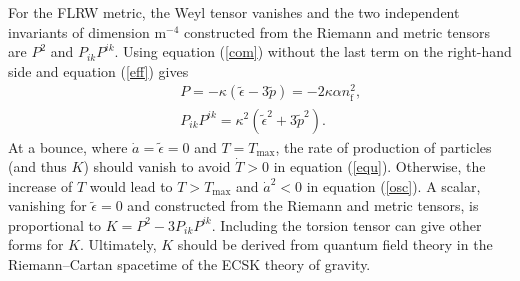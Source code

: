 \documentclass[prd,onecolumn,nofootinbib]{revtex4}
\begin{document}
For the FLRW metric, the Weyl tensor vanishes and the two independent invariants of dimension m$^{-4}$ constructed from the Riemann and metric tensors are $P^2$ and $P_{ik}P^{ik}$.
Using equation (\ref{com}) without the last term on the right-hand side and equation (\ref{eff}) gives
\begin{eqnarray}
& & P=-\kappa(\tilde{\epsilon}-3\tilde{p})=-2\kappa\alpha n_\textrm{f}^2, \nonumber \\
& & P_{ik}P^{ik}=\kappa^2(\tilde{\epsilon}^2+3\tilde{p}^2).
\end{eqnarray}
At a bounce, where $\dot{a}=\tilde{\epsilon}=0$ and $T=T_\textrm{max}$, the rate of production of particles (and thus $K$) should vanish to avoid $\dot{T}>0$ in equation (\ref{equ}).
Otherwise, the increase of $T$ would lead to $T>T_\textrm{max}$ and $\dot{a}^2<0$ in equation (\ref{osc}).
A scalar, vanishing for $\tilde{\epsilon}=0$ and constructed from the Riemann and metric tensors, is proportional to $K=P^2-3P_{ik}P^{ik}$.
Including the torsion tensor can give other forms for $K$.
Ultimately, $K$ should be derived from quantum field theory in the Riemann--Cartan spacetime of the ECSK theory of gravity.
\end{document}
